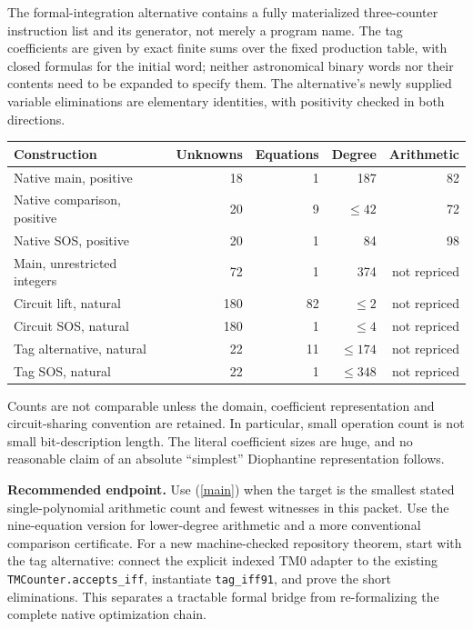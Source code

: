 \documentclass[10pt]{article}
\newcommand{\code}[1]{\texttt{#1}}
\begin{document}
The formal-integration alternative contains a fully materialized three-counter instruction list and its generator, not merely a program name. The tag coefficients are given by exact finite sums over the fixed production table, with closed formulas for the initial word; neither astronomical binary words nor their contents need to be expanded to specify them. The alternative's newly supplied variable eliminations are elementary identities, with positivity checked in both directions.

\begin{center}
\begin{tabular}{lrrrr}
Construction & Unknowns & Equations & Degree & Arithmetic\\\hline
Native main, positive &18&1&187&82\\
Native comparison, positive &20&9&$\le42$&72\\
Native SOS, positive &20&1&84&98\\
Main, unrestricted integers &72&1&374&not repriced\\
Circuit lift, natural &180&82&$\le2$&not repriced\\
Circuit SOS, natural &180&1&$\le4$&not repriced\\
Tag alternative, natural &22&11&$\le174$&not repriced\\
Tag SOS, natural &22&1&$\le348$&not repriced
\end{tabular}
\end{center}
Counts are not comparable unless the domain, coefficient representation and circuit-sharing convention are retained. In particular, small operation count is not small bit-description length. The literal coefficient sizes are huge, and no reasonable claim of an absolute ``simplest'' Diophantine representation follows.

\textbf{Recommended endpoint.} Use (\ref{main}) when the target is the smallest stated single-polynomial arithmetic count and fewest witnesses in this packet. Use the nine-equation version for lower-degree arithmetic and a more conventional comparison certificate. For a new machine-checked repository theorem, start with the tag alternative: connect the explicit indexed TM0 adapter to the existing \code{TMCounter.accepts\_iff}, instantiate \code{tag\_iff91}, and prove the short eliminations. This separates a tractable formal bridge from re-formalizing the complete native optimization chain.
\end{document}
